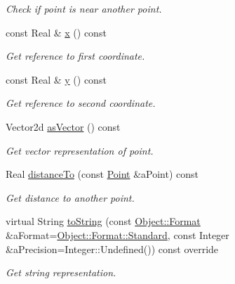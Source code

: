 \begin{DoxyCompactItemize}
\begin{DoxyCompactList}\small\item\em Check if point is near another point. \end{DoxyCompactList}\item 
const Real \& \hyperlink{classostk_1_1math_1_1geom_1_1d2_1_1objects_1_1_point_a59a7671f0609ce006479ae0d0f463e05}{x} () const
\begin{DoxyCompactList}\small\item\em Get reference to first coordinate. \end{DoxyCompactList}\item 
const Real \& \hyperlink{classostk_1_1math_1_1geom_1_1d2_1_1objects_1_1_point_a88caead5c128a3ca938506a8738ee279}{y} () const
\begin{DoxyCompactList}\small\item\em Get reference to second coordinate. \end{DoxyCompactList}\item 
Vector2d \hyperlink{classostk_1_1math_1_1geom_1_1d2_1_1objects_1_1_point_a19aa06ed436313a39c332caffcf2c86a}{as\+Vector} () const
\begin{DoxyCompactList}\small\item\em Get vector representation of point. \end{DoxyCompactList}\item 
Real \hyperlink{classostk_1_1math_1_1geom_1_1d2_1_1objects_1_1_point_a6e073732f59ff702531afbcaad286ec2}{distance\+To} (const \hyperlink{classostk_1_1math_1_1geom_1_1d2_1_1objects_1_1_point}{Point} \&a\+Point) const
\begin{DoxyCompactList}\small\item\em Get distance to another point. \end{DoxyCompactList}\item 
virtual String \hyperlink{classostk_1_1math_1_1geom_1_1d2_1_1objects_1_1_point_ac8fdaee79af60e2972257e43ff175f12}{to\+String} (const \hyperlink{classostk_1_1math_1_1geom_1_1d2_1_1_object_aa76f9e30caebf4005bafbdff447f66cf}{Object\+::\+Format} \&a\+Format=\hyperlink{classostk_1_1math_1_1geom_1_1d2_1_1_object_aa76f9e30caebf4005bafbdff447f66cfaeb6d8ae6f20283755b339c0dc273988b}{Object\+::\+Format\+::\+Standard}, const Integer \&a\+Precision=Integer\+::\+Undefined()) const override
\begin{DoxyCompactList}\small\item\em Get string representation. \end{DoxyCompactList}\item 

\end{DoxyCompactItemize}
